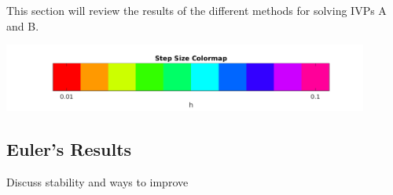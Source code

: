 \documentclass{article}
\begin{document}
This section will review the results of the different methods for solving IVPs A and B. 




\begin{center}
  \includegraphics[width=0.9\textwidth]{../output/colormap.png}
  \label{fig:h_val_colormap}
\end{center}


\subsection{Euler's Results}
\label{results:euler}

Discuss stability and ways to improve
\end{document}
